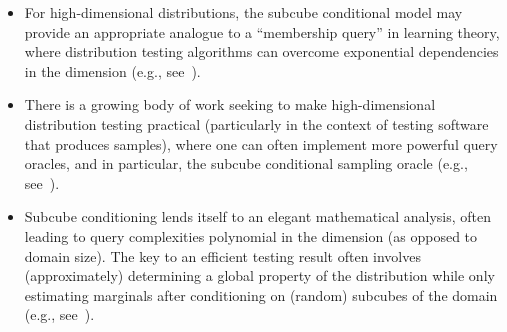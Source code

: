 \begin{flushleft}\begin{itemize}
\item For high-dimensional distributions, the subcube conditional model may provide an appropriate analogue to a ``membership query'' in learning theory, where distribution testing algorithms can overcome exponential dependencies in the dimension (e.g., see~\cite{CJLW21b, BLMT23}).
\item There is a growing body of work seeking to make high-dimensional distribution testing practical (particularly in the context of testing software that produces samples), where one can often implement more powerful query oracles, and in particular, the subcube conditional sampling oracle (e.g., see~\cite{MPC20, PM22,BCPSS24}).
\item Subcube conditioning lends itself to an elegant mathematical analysis, often leading to query complexities polynomial in the dimension (as opposed
    to domain size). The key to an efficient testing result often involves (approximately) determining a global property of the distribution while only estimating marginals after conditioning on (random) subcubes of the domain (e.g., see~\cite{CCKLW21, BCSV23, CM24, AFL24}).
\end{itemize}\end{flushleft}

